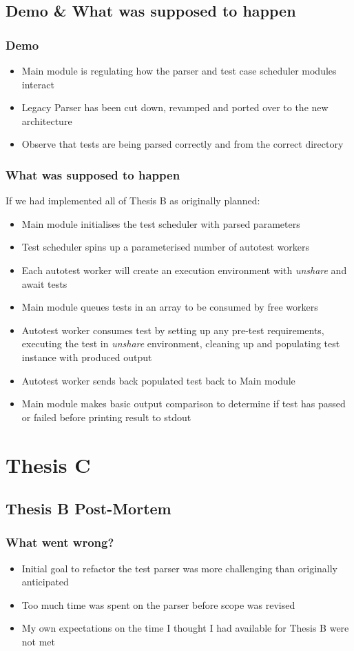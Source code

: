 \documentclass[xcolor]{beamer}
\begin{document}
\subsection{Demo \& What was supposed to happen}
\begin{frame}
	\frametitle{Demo}
	\begin{itemize}
		\item Main module is regulating how the parser and test case scheduler modules interact
		\item Legacy Parser has been cut down, revamped and ported over to the new architecture
		\item Observe that tests are being parsed correctly and from the correct directory
	\end{itemize}
\end{frame}

\begin{frame}
	\frametitle{What was supposed to happen}
	If we had implemented all of Thesis B as originally planned:
	\pause
	\begin{itemize}
		\item Main module initialises the test scheduler with parsed parameters
		\pause
		\item Test scheduler spins up a parameterised number of autotest workers
		\pause
		\item Each autotest worker will create an execution environment with \textit{unshare} and await tests
		\pause
		\item Main module queues tests in an array to be consumed by free workers
		\pause
		\item Autotest worker consumes test by setting up any pre-test requirements, executing the test in \textit{unshare} environment, cleaning up and populating test instance with produced output
		\pause
		\item Autotest worker sends back populated test back to Main module
		\pause
		\item Main module makes basic output comparison to determine if test has passed or failed before printing result to stdout
	\end{itemize}
\end{frame}

\section{Thesis C}
\subsection{Thesis B Post-Mortem}
\begin{frame}
	\frametitle{What went wrong?}
	\begin{itemize}
		\item Initial goal to refactor the test parser was more challenging than originally anticipated
		\pause
		\item Too much time was spent on the parser before scope was revised
		\pause
		\item My own expectations on the time I thought I had available for Thesis B were not met
	\end{itemize}
\end{frame}
\end{document}
